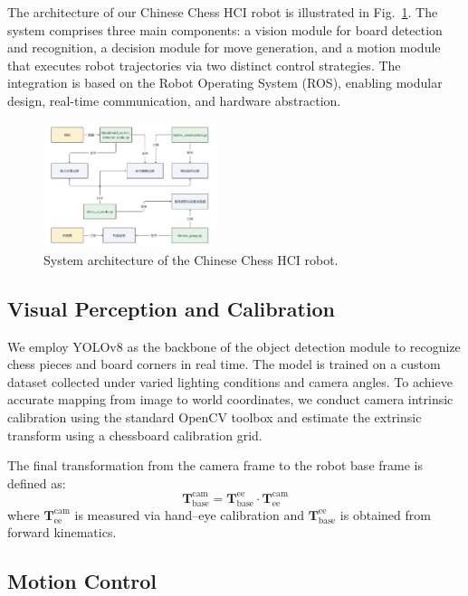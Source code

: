 \documentclass[conference]{IEEEtran}
\begin{document}
The architecture of our Chinese Chess HCI robot is illustrated in Fig.~\ref{fig:system}. The system comprises three main components: a vision module for board detection and recognition, a decision module for move generation, and a motion module that executes robot trajectories via two distinct control strategies. The integration is based on the Robot Operating System (ROS), enabling modular design, real-time communication, and hardware abstraction.

\begin{figure}[htbp]
	\centering
	\includegraphics[width=0.45\textwidth]{figures/system_architecture.png}
	\caption{System architecture of the Chinese Chess HCI robot.}
	\label{fig:system}
\end{figure}

\subsection{Visual Perception and Calibration}

We employ YOLOv8 as the backbone of the object detection module to recognize chess pieces and board corners in real time. The model is trained on a custom dataset collected under varied lighting conditions and camera angles. To achieve accurate mapping from image to world coordinates, we conduct camera intrinsic calibration using the standard OpenCV toolbox and estimate the extrinsic transform using a chessboard calibration grid.

The final transformation from the camera frame to the robot base frame is defined as:
\begin{equation}
	\mathbf{T}_{\text{base}}^{\text{cam}} = \mathbf{T}_{\text{base}}^{\text{ee}} \cdot \mathbf{T}_{\text{ee}}^{\text{cam}}
\end{equation}
where $\mathbf{T}_{\text{ee}}^{\text{cam}}$ is measured via hand–eye calibration and $\mathbf{T}_{\text{base}}^{\text{ee}}$ is obtained from forward kinematics.

\subsection{Motion Control}
\end{document}
